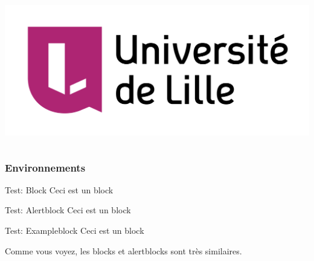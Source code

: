 \documentclass[svgnames,12pt,aspectratio=149]{beamer}
\begin{document}
\begin{frame}
\begin{columns}
    \begin{column}{0.33\textwidth}
      \includegraphics[width=1.0\textwidth]{logo-UdLille}
    \end{column}
  \end{columns}
\end{frame}


\begin{frame}
  \frametitle{Environnements}
  \begin{block}{Test: Block}
    Ceci est un block
  \end{block}


  \begin{alertblock}{Test: Alertblock}
    Ceci est un block
  \end{alertblock}

  \begin{exampleblock}{Test: Exampleblock}
    Ceci est un block
  \end{exampleblock}

  Comme vous voyez, les \alert{blocks} et \alert{alertblocks} sont très similaires.
  
\end{frame}
\end{document}
